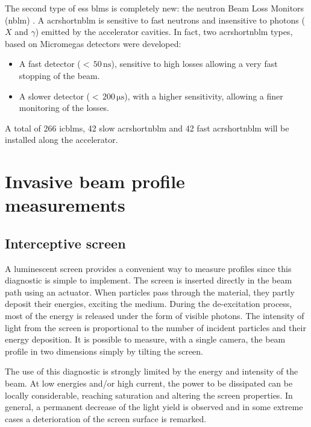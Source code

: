 \begin{refsection}
  

  The second type of \acrshort{ess} \acrshort{blm}s is completely new: the neutron Beam Loss Monitors (\acrshort{nblm}) \cite{Papaevangelou:HB2018-THA1WE04}.
  A acrshort{nblm} is sensitive to fast neutrons and insensitive to photons ($X$ and $\gamma$) emitted by the accelerator cavities. In fact, two acrshort{nblm} types, based on Micromegas detectors \cite{GIOMATARIS199629} were developed:
  \begin{itemize}
    \item A fast detector ($<\,50\,\mathrm{ns}$), sensitive to high losses allowing a very fast stopping of the beam.
    \item A slower detector ($<\,200\,\mathrm{\mu s}$), with a higher sensitivity, allowing a finer monitoring of the losses.
  \end{itemize}

  A total of 266 \acrshort{icblm}s, 42 slow acrshort{nblm} and 42 fast acrshort{nblm} will be installed along the accelerator.


  \section{Invasive beam profile measurements}
  \subsection{Interceptive screen}
  A luminescent screen provides a convenient way to measure profiles since this diagnostic is simple to implement. The screen is inserted directly in the beam path using an actuator. When particles pass through the material, they partly deposit their energies, exciting the medium. During the de-excitation process, most of the energy is released under the form of visible photons. The intensity of light from the screen is proportional to the number of incident particles and their energy deposition. It is possible to measure, with a single camera, the beam profile in two dimensions simply by tilting the screen.

  The use of this diagnostic is strongly limited by the energy and intensity of the beam. At low energies and/or high current, the power to be dissipated can be locally considerable, reaching saturation and altering the screen properties. In general, a permanent decrease of the light yield is observed \cite{Simon:IBIC2016-MOPG79} and in some extreme cases a deterioration of the screen surface is remarked.


\end{refsection}

